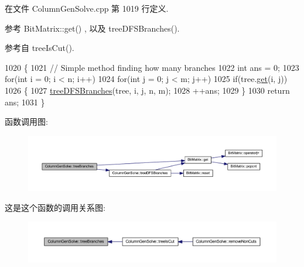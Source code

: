 在文件 Column\+Gen\+Solve.\+cpp 第 1019 行定义.



参考 Bit\+Matrix\+::get() , 以及 tree\+D\+F\+S\+Branches().



参考自 tree\+Is\+Cut().


\begin{DoxyCode}
1020 \{
1021     \textcolor{comment}{// Simple method finding how many branches}
1022     \textcolor{keywordtype}{int} ans = 0;
1023     \textcolor{keywordflow}{for}(\textcolor{keywordtype}{int} i = 0; i < n; i++)
1024         \textcolor{keywordflow}{for}(\textcolor{keywordtype}{int} j = 0; j < m; j++)
1025             \textcolor{keywordflow}{if}(tree.\hyperlink{classBitMatrix_ad19d1045b54ccc8a99d70d38305b4ca6}{get}(i, j))
1026             \{
1027                 \hyperlink{classColumnGenSolve_a57004ff3ac6bffa4f19fa5838a851a25}{treeDFSBranches}(tree, i, j, n, m);
1028                 ++ans;
1029             \}
1030     \textcolor{keywordflow}{return} ans;
1031 \}
\end{DoxyCode}


函数调用图\+:
\nopagebreak
\begin{figure}[H]
\begin{center}
\leavevmode
\includegraphics[width=350pt]{classColumnGenSolve_ac6a085a6c1704afde58891f19d1acf78_cgraph}
\end{center}
\end{figure}




这是这个函数的调用关系图\+:
\nopagebreak
\begin{figure}[H]
\begin{center}
\leavevmode
\includegraphics[width=350pt]{classColumnGenSolve_ac6a085a6c1704afde58891f19d1acf78_icgraph}
\end{center}
\end{figure}


